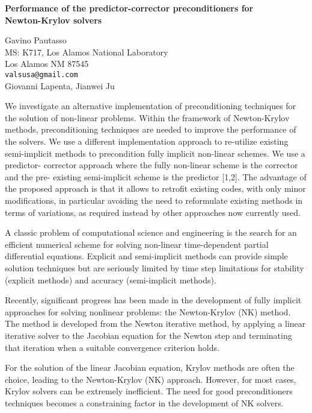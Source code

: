 \documentclass[twosided]{report}
\begin{document}
\begin{center}
{\large			%
{\bf Performance of the predictor-corrector preconditioners for \\
	Newton-Krylov solvers}}

	Gavino Pautasso \\
	MS: K717,  Los Alamos National Laboratory \\
	Los Alamos NM 87545 \\
	{\tt valsusa@gmail.com} \\
	Giovanni Lapenta, Jianwei Ju
\end{center}
We investigate an alternative implementation of
preconditioning techniques for the solution of non-linear
problems. Within the framework of Newton-Krylov methods,
preconditioning techniques are needed to improve the
performance of the solvers. We use a different
implementation approach to re-utilize existing semi-implicit
methods to precondition fully implicit non-linear schemes.
We use a predictor- corrector approach where the fully
non-linear scheme is the corrector and the pre- existing
semi-implicit scheme is the predictor [1,2]. The advantage
of the proposed approach is that it allows to retrofit
existing codes, with only minor modifications, in particular
avoiding the need to reformulate existing methods in terms
of variations, as required instead by other approaches now
currently used.

A classic problem of computational
science and engineering is the search for an efficient
numerical scheme for solving non-linear time-dependent
partial differential equations. Explicit and semi-implicit
methods can provide simple solution techniques but are
seriously limited by time step limitations for stability
(explicit methods) and accuracy (semi-implicit methods).


Recently, significant progress has been made in the
development of fully implicit approaches for solving
nonlinear problems: the Newton-Krylov (NK) method. The
method is developed from the Newton iterative method, by
applying a linear iterative solver to the Jacobian equation
for the Newton step and terminating that iteration when a
suitable convergence criterion holds.

For the solution of
the linear Jacobian equation, Krylov methods are often the
choice, leading to the Newton-Krylov (NK) approach. However,
for most cases, Krylov solvers can be extremely inefficient.
The need for good preconditioners techniques becomes a
constraining factor in the development of NK solvers.
\end{document}
